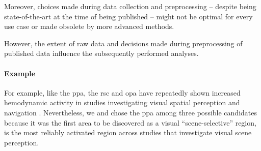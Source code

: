 




Moreover, choices made during data collection and preprocessing -- despite being
state-of-the-art at the time of being published -- might not be optimal for
every use case or made obsolete by more advanced methods.

%
However, the extent of raw data and decisions made during preprocessing of
published data influence the subsequently performed analyses.

\paragraph{Example}
%
For example, like the \ac{ppa}, the \ac{rsc} and \ac{opa} have repeatedly shown
increased hemodynamic activity in studies investigating visual spatial
perception and navigation \citep{chrastil2018heterogeneity, bettencourt2013role,
dilks2013occipital, epstein2019scene}.
%
Nevertheless, we and \citet{sengupta2016extension} chose the \ac{ppa} among
three possible candidates because it was the first area to be discovered as a
visual ``scene-selective'' region, is the most reliably activated region across
studies that investigate visual scene perception.

